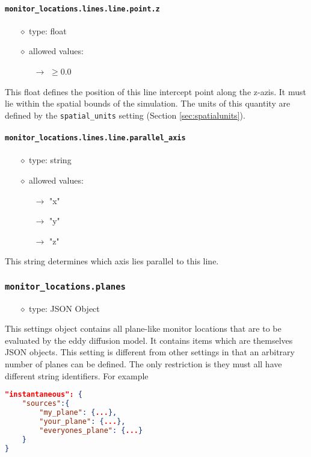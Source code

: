 \documentclass[]{article}
\def\code#1{\texttt{#1}}
\begin{document}
\paragraph{\code{monitor\_locations.lines.line.point.z}}
\begin{itemize}
    \item[$\diamond$] type: float 
    \item[$\diamond$] allowed values:
    \begin{itemize}
        \item[$\rightarrow$] $\geq0.0$
    \end{itemize}
\end{itemize}
This float defines the position of this line intercept point along the z-azis. It
must lie within the spatial bounds of the simulation. The units of this quantity
are defined by the \code{spatial\_units} setting (Section
\ref{sec:spatialunits}).


\paragraph{\code{monitor\_locations.lines.line.parallel\_axis}}
\begin{itemize}
    \item[$\diamond$] type: string 
    \item[$\diamond$] allowed values:
    \begin{itemize}
        \item[$\rightarrow$] "x"
        \item[$\rightarrow$] "y"
        \item[$\rightarrow$] "z"
    \end{itemize}
\end{itemize}
This string determines which axis lies parallel to this line.

\subsubsection{\code{monitor\_locations.planes}}\label{sec:monplanes}
\begin{itemize}
    \item[$\diamond$] type: JSON Object 
\end{itemize}
This settings object contains all plane-like monitor locations that are to be
evaluated by the eddy diffusion model. It contains items which
are themselves JSON objects. This setting is different from other settings in
that an arbitrary number of planes can be defined. The only restriction is they
must all have different string identifiers. For example\\
\begin{lstlisting}[language=json,firstnumber=1]
"instantaneous": {
    "sources":{
        "my_plane": {...},
        "your_plane": {...},
        "everyones_plane": {...}
    }
}
\end{lstlisting}
\end{document}
